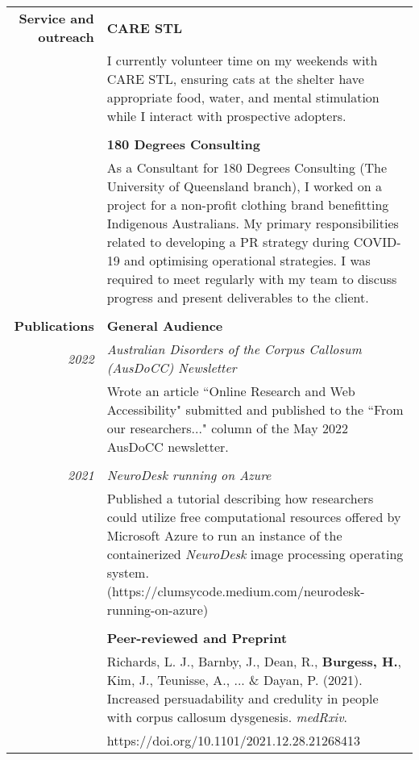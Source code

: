 \documentclass{article}
\begin{document}
\begin{longtable}{r | p{13cm}}
		\large\textbf{Service and outreach} & \large\textbf{CARE STL} \\
											& I currently volunteer time on my weekends with CARE STL, ensuring cats at the shelter have appropriate food, water, and mental stimulation while I interact with prospective adopters. \\	
											& \\

											& \large\textbf{180 Degrees Consulting} \\
											& As a Consultant for 180 Degrees Consulting (The University of Queensland branch), I worked on a project for a non-profit clothing brand benefitting Indigenous Australians. My primary responsibilities related to developing a PR strategy during COVID-19 and optimising operational strategies. I was required to meet regularly with my team to discuss progress and present deliverables to the client. \\	
											& \\

		\large\textbf{Publications}			& \large\textbf{General Audience} \\
		\large\textit{2022}					& \large\textit{Australian Disorders of the Corpus Callosum (AusDoCC) Newsletter} \\
											& Wrote an article ``Online Research and Web Accessibility" submitted and published to the ``From our researchers..." column of the May 2022 AusDoCC newsletter. \\	
											& \\
											
		\large\textit{2021}					& \large\textit{NeuroDesk running on Azure}	\\	
											& Published a tutorial describing how researchers could utilize free computational resources offered by Microsoft Azure to run an instance of the containerized \textit{NeuroDesk} image processing operating system. (https://clumsycode.medium.com/neurodesk-running-on-azure) \\
											& \\
											
											& \large\textbf{Peer-reviewed and Preprint} \\
											& Richards, L. J., Barnby, J., Dean, R., \textbf{Burgess, H.}, Kim, J., Teunisse, A., ... \& Dayan, P. (2021). Increased persuadability and credulity in people with corpus callosum dysgenesis. \textit{medRxiv}. \\
											& https://doi.org/10.1101/2021.12.28.21268413 \\


\end{longtable}
\end{document}
